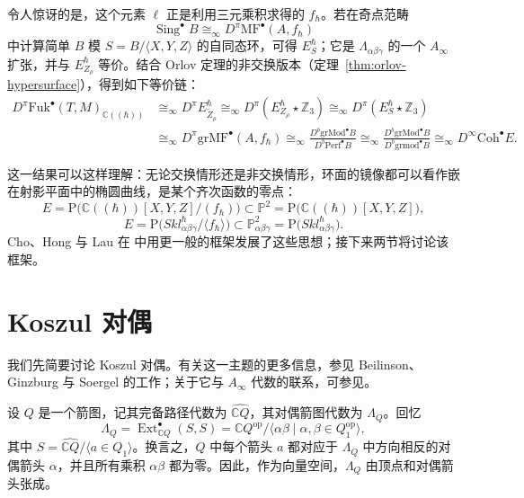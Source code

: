 令人惊讶的是，这个元素 $\ell$ 正是利用三元乘积求得的 $f_\hbar$。若在奇点范畴
\[
  \operatorname{Sing}^{\bullet}B\cong_\infty D^{\pi}\mathrm{MF}^{\bullet}(A,f_\hbar)
\]
中计算简单 $B$ 模 $S=B/\langle X,Y,Z\rangle$ 的自同态环，可得 $E^\hbar_S$；它是 $\Lambda_{\alpha\beta\gamma}$ 的一个 $A_\infty$ 扩张，并与 $E^\hbar_{Z_\rho}$ 等价。结合 Orlov 定理的非交换版本（定理~\ref{thm:orlov-hypersurface}），得到如下等价链：
\[
\begin{aligned}
  D^{\pi}\mathrm{Fuk}^{\bullet}(T,M)_{\mathbb C((\hbar))}
  &\cong_\infty D^{\pi}E^\hbar_{\widetilde Z_\rho}
   \cong_\infty D^{\pi}(E^\hbar_{Z_\rho}\star\mathbb Z_3)
   \cong_\infty D^{\pi}(E^\hbar_S\star\mathbb Z_3)\\
  &\cong_\infty D^{\pi}\mathrm{grMF}^{\bullet}(A,f_\hbar)
   \cong_\infty\frac{D^b\mathrm{grMod}^{\bullet}B}{D^b\mathrm{Perf}^{\bullet}B}
   \cong_\infty\frac{D^b\mathrm{grMod}^{\bullet}B}{D^b\mathrm{grmod}^{\bullet}B}
   \cong_\infty D^{\infty}\mathrm{Coh}^{\bullet}E.
\end{aligned}
\]


这一结果可以这样理解：无论交换情形还是非交换情形，环面的镜像都可以看作嵌在射影平面中的椭圆曲线，是某个齐次函数的零点：
\[
  E=\mathrm P\bigl(\mathbb C((\hbar))[X,Y,Z]/(f_\hbar)\bigr)
  \subset\mathbb P^2=\mathrm P\bigl(\mathbb C((\hbar))[X,Y,Z]\bigr),
\]
\[
  E=\mathrm P\bigl(Skl^{\hbar}_{\alpha\beta\gamma}/\langle f_\hbar\rangle\bigr)
  \subset\mathbb P^2_{\alpha\beta\gamma}
  =\mathrm P\bigl(Skl^{\hbar}_{\alpha\beta\gamma}\bigr).
\]
Cho、Hong 与 Lau 在 中用更一般的框架发展了这些思想；接下来两节将讨论该框架。

\section{Koszul 对偶}\label{sec:koszul-duality}

我们先简要讨论 Koszul 对偶。有关这一主题的更多信息，参见 Beilinson、Ginzburg 与 Soergel 的工作；关于它与 $A_\infty$ 代数的联系，可参见。

设 $Q$ 是一个箭图，记其完备路径代数为 $\widehat{\mathbb C Q}$，其对偶箭图代数为 $\Lambda_Q$。回忆
\[
  \Lambda_Q=\operatorname{Ext}^{\bullet}_{\mathbb C Q}(S,S)
  =\mathbb C Q^{\mathrm{op}}/\langle\alpha\beta\mid\alpha,\beta\in Q_1^{\mathrm{op}}\rangle,
\]
其中 $S=\widehat{\mathbb C Q}/\langle a\in Q_1\rangle$。换言之，$Q$ 中每个箭头 $a$ 都对应于 $\Lambda_Q$ 中方向相反的对偶箭头 $\alpha$，并且所有乘积 $\alpha\beta$ 都为零。因此，作为向量空间，$\Lambda_Q$ 由顶点和对偶箭头张成。

